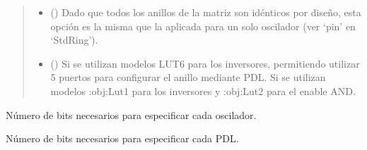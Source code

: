 \documentclass[letterpaper,10pt,english]{sphinxmanual}
\begin{document}
\begin{fulllineitems}
\begin{quote}
\begin{description}
\begin{itemize}
\item {} 
\sphinxAtStartPar
{} (\sphinxstyleliteralemphasis{\sphinxupquote{ | }}\sphinxstyleliteralemphasis{\sphinxupquote{(}}\sphinxstyleliteralemphasis{\sphinxupquote{)}}) \textendash{} Dado que todos los anillos de la matriz son idénticos por diseño, esta opción es la misma que la aplicada para un solo oscilador (ver ‘pin’ en ‘StdRing’).

\item {} 
\sphinxAtStartPar
{} (\sphinxstyleliteralemphasis{\sphinxupquote{, }}) \textendash{} Si  se utilizan modelos LUT6 para los inversores, permitiendo utilizar 5 puertos para configurar el anillo mediante PDL. Si  se utilizan modelos :obj:Lut1 para los inversores y :obj:Lut2 para el enable AND.

\end{itemize}

\end{description}\end{quote}

\begin{fulllineitems}
\label{\detokenize{fpga.ring_osc:fpga.ring_osc.StdMatrix.N_bits_osc}}
\pysigstartsignatures
{}
\pysigstopsignatures
\sphinxAtStartPar
Número de bits necesarios para especificar cada oscilador.

\end{fulllineitems}


\begin{fulllineitems}
\label{\detokenize{fpga.ring_osc:fpga.ring_osc.StdMatrix.N_bits_pdl}}
\pysigstartsignatures
{}
\pysigstopsignatures
\sphinxAtStartPar
Número de bits necesarios para especificar cada PDL.

\end{fulllineitems}


\end{fulllineitems}
\end{document}
